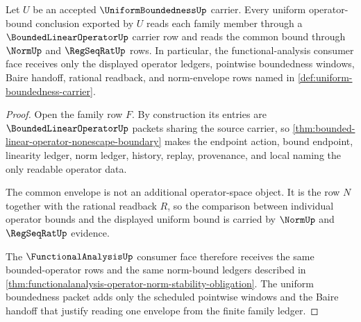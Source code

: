 \begin{theorem}
\label{thm:uniform-boundedness-bounded-operator-envelope}
Let $U$ be an accepted $\UniformBoundednessUp$ carrier. Every uniform operator-bound conclusion exported by $U$ reads each family member through a $\BoundedLinearOperatorUp$ carrier row and reads the common bound through $\NormUp$ and $\RegSeqRatUp$ rows. In particular, the functional-analysis consumer face receives only the displayed operator ledgers, pointwise boundedness windows, Baire handoff, rational readback, and norm-envelope rows named in \autoref{def:uniform-boundedness-carrier}.
\end{theorem}
\begin{proof}
Open the family row $F$. By construction its entries are $\BoundedLinearOperatorUp$ packets sharing the source carrier, so \autoref{thm:bounded-linear-operator-nonescape-boundary} makes the endpoint action, bound endpoint, linearity ledger, norm ledger, history, replay, provenance, and local naming the only readable operator data.

The common envelope is not an additional operator-space object. It is the row $N$ together with the rational readback $R$, so the comparison between individual operator bounds and the displayed uniform bound is carried by $\NormUp$ and $\RegSeqRatUp$ evidence.

The $\FunctionalAnalysisUp$ consumer face therefore receives the same bounded-operator rows and the same norm-bound ledgers described in \autoref{thm:functionalanalysis-operator-norm-stability-obligation}. The uniform boundedness packet adds only the scheduled pointwise windows and the Baire handoff that justify reading one envelope from the finite family ledger.
\end{proof}

